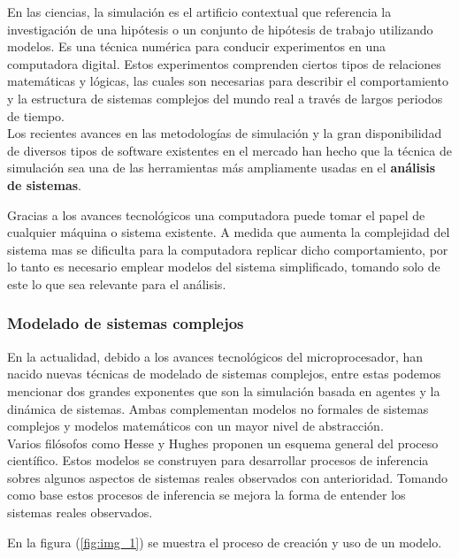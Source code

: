 En las ciencias, la simulación es el artificio contextual que referencia la investigación de una hipótesis o un conjunto de hipótesis de trabajo utilizando modelos.
Es una técnica numérica para conducir experimentos en una computadora digital. Estos experimentos comprenden ciertos tipos de relaciones matemáticas y lógicas, las cuales son necesarias para describir el comportamiento y la estructura de sistemas complejos del mundo real a través de largos periodos de tiempo. \parencite{noauthor_simulacion_nodate}\\


Los recientes avances en las metodologías de simulación y la gran disponibilidad de diversos tipos de software existentes en el mercado han hecho que la técnica de simulación sea una de las herramientas más ampliamente usadas en el \textbf{análisis de sistemas}.

Gracias a los avances tecnológicos una computadora puede tomar el papel de cualquier máquina o sistema existente. A medida que aumenta la complejidad del sistema mas se dificulta para la computadora replicar dicho comportamiento, por lo tanto es necesario emplear modelos del sistema simplificado, tomando solo de este lo que sea relevante para el análisis.

\subsubsection{Modelado de sistemas complejos}

En la actualidad, debido a los avances tecnológicos del microprocesador, han nacido nuevas técnicas de modelado de sistemas complejos, entre estas podemos mencionar dos grandes exponentes que son la simulación basada en agentes y la dinámica de sistemas. Ambas complementan modelos no formales de sistemas complejos y modelos matemáticos con un mayor nivel de abstracción.\\

Varios filósofos como Hesse \parencite{echenique1970models} y Hughes \parencite{hughes1997models} proponen un esquema general del proceso científico. Estos modelos se construyen para desarrollar procesos de inferencia sobres algunos aspectos de sistemas reales observados con anterioridad. Tomando como base estos procesos de inferencia se mejora la forma de entender los sistemas reales observados. \parencite{izquierdo2008modelado}

En la figura (\ref{fig:img_1}) se muestra el proceso de creación y uso de un modelo.

